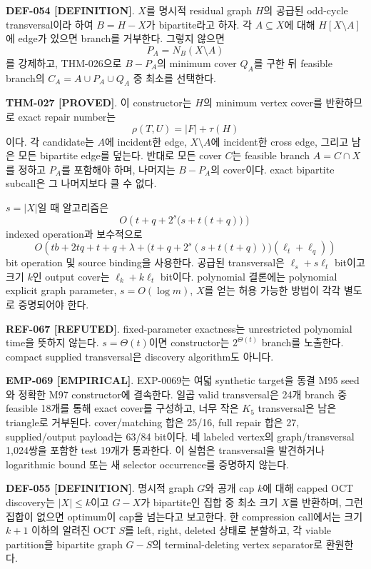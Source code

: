 \documentclass[11pt]{article}
\newcommand{\claimstatus}[2]{\textbf{#1 [#2]}}
\begin{document}
\claimstatus{DEF-054}{DEFINITION}. \(X\)를 명시적 residual graph
\(H\)의 공급된 odd-cycle transversal이라 하여 \(B=H-X\)가
bipartite라고 하자. 각 \(A\subseteq X\)에 대해
\(H[X\setminus A]\)에 edge가 있으면 branch를 거부한다. 그렇지 않으면
\[
 P_A=N_B(X\setminus A)
\]
를 강제하고, THM-026으로 \(B-P_A\)의 minimum cover \(Q_A\)를
구한 뒤 feasible branch의 \(C_A=A\cup P_A\cup Q_A\) 중 최소를
선택한다.

\claimstatus{THM-027}{PROVED}. 이 constructor는 \(H\)의 minimum
vertex cover를 반환하므로 exact repair number는
\[
 \rho(T,U)=|F|+\tau(H)
\]
이다. 각 candidate는 \(A\)에 incident한 edge, \(X\setminus A\)에
incident한 cross edge, 그리고 남은 모든 bipartite edge를 덮는다.
반대로 모든 cover \(C\)는 feasible branch \(A=C\cap X\)를 정하고
\(P_A\)를 포함해야 하며, 나머지는 \(B-P_A\)의 cover이다. exact
bipartite subcall은 그 나머지보다 클 수 없다.

\(s=|X|\)일 때 알고리즘은
\[
 O\!\left(t+q+2^s\bigl(s+t(t+q)\bigr)\right)
\]
indexed operation과 보수적으로
\[
 O\!\left(
 tb+2tq+t+q+\lambda+
 \bigl(t+q+2^s(s+t(t+q))\bigr)(\ell_t+\ell_q)
 \right)
\]
bit operation 및 source binding을 사용한다. 공급된 transversal은
\(\ell_s+s\ell_t\) bit이고 크기 \(k\)인 output cover는
\(\ell_k+k\ell_t\) bit이다. polynomial 결론에는 polynomial explicit
graph parameter, \(s=O(\log m)\), \(X\)를 얻는 허용 가능한 방법이
각각 별도로 증명되어야 한다.

\claimstatus{REF-067}{REFUTED}. fixed-parameter exactness는 unrestricted
polynomial time을 뜻하지 않는다. \(s=\Theta(t)\)이면 constructor는
\(2^{\Theta(t)}\) branch를 노출한다. compact supplied transversal은
discovery algorithm도 아니다.

\claimstatus{EMP-069}{EMPIRICAL}. EXP-0069는 여덟 synthetic target을
동결 M95 seed와 정확한 M97 constructor에 결속한다. 일곱 valid
transversal은 24개 branch 중 feasible 18개를 통해 exact cover를
구성하고, 너무 작은 \(K_5\) transversal은 남은 triangle로 거부된다.
cover/matching 합은 25/16, full repair 합은 27, supplied/output
payload는 63/84 bit이다. 네 labeled vertex의 graph/transversal
1,024쌍을 포함한 test 19개가 통과한다. 이 실험은 transversal을
발견하거나 logarithmic bound 또는 새 selector occurrence를 증명하지
않는다.

\claimstatus{DEF-055}{DEFINITION}. 명시적 graph \(G\)와 공개 cap
\(k\)에 대해 capped OCT discovery는 \(|X|\le k\)이고 \(G-X\)가
bipartite인 집합 중 최소 크기 \(X\)를 반환하며, 그런 집합이 없으면
optimum이 cap을 넘는다고 보고한다. 한 compression call에서는 크기
\(k+1\) 이하의 알려진 OCT \(S\)를 left, right, deleted 상태로
분할하고, 각 viable partition을 bipartite graph \(G-S\)의
terminal-deleting vertex separator로 환원한다.
\end{document}
